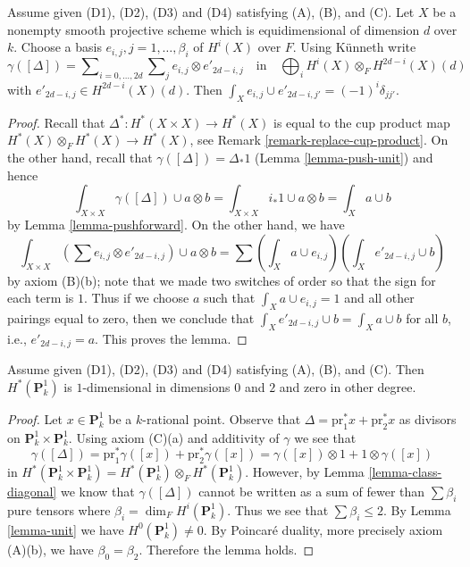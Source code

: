 \begin{lemma}
\label{lemma-class-diagonal}
Assume given (D1), (D2), (D3) and (D4) satisfying (A), (B), and (C).
Let $X$ be a nonempty smooth projective scheme which is equidimensional
of dimension $d$ over $k$. Choose a basis
$e_{i, j}, j = 1, \ldots, \beta_i$ of $H^i(X)$ over $F$.
Using K\"unneth write
$$
\gamma([\Delta]) =
\sum\nolimits_{i = 0, \ldots, 2d}
\sum\nolimits_j e_{i, j} \otimes e'_{2d - i , j}
\quad\text{in}\quad
\bigoplus\nolimits_i H^i(X) \otimes_F H^{2d - i}(X)(d)
$$
with $e'_{2d - i, j} \in H^{2d - i}(X)(d)$.
Then $\int_X e_{i, j} \cup e'_{2d - i, j'} = (-1)^i\delta_{jj'}$.
\end{lemma}

\begin{proof}
Recall that $\Delta^* : H^*(X \times X) \to H^*(X)$ is equal to the
cup product map $H^*(X) \otimes_F H^*(X) \to H^*(X)$, see
Remark \ref{remark-replace-cup-product}. On the other
hand, recall that $\gamma([\Delta]) = \Delta_*1$ (Lemma \ref{lemma-push-unit})
and hence
$$
\int_{X \times X} \gamma([\Delta]) \cup a \otimes b =
\int_{X \times X} i_*1 \cup a \otimes b =
\int_X a \cup b
$$
by Lemma \ref{lemma-pushforward}.
On the other hand, we have
$$
\int_{X \times X} (\sum e_{i, j} \otimes e'_{2d -i , j}) \cup a \otimes b =
\sum (\int_X a \cup e_{i, j})(\int_X e'_{2d - i, j} \cup b)
$$
by axiom (B)(b); note that we made two switches of order so that the sign
for each term is $1$. Thus if we choose $a$ such that
$\int_X a \cup e_{i, j} = 1$ and all other pairings equal to zero, then
we conclude that $\int_X e'_{2d - i, j} \cup b = \int_X a \cup b$
for all $b$, i.e., $e'_{2d - i, j} = a$. This proves the lemma.
\end{proof}

\begin{lemma}
\label{lemma-cohomology-P1}
Assume given (D1), (D2), (D3) and (D4) satisfying (A), (B), and (C).
Then $H^*(\mathbf{P}^1_k)$ is $1$-dimensional in dimensions $0$ and $2$
and zero in other degree.
\end{lemma}

\begin{proof}
Let $x \in \mathbf{P}^1_k$ be a $k$-rational point. Observe that
$\Delta = \text{pr}_1^*x + \text{pr}_2^*x$ as divisors on
$\mathbf{P}^1_k \times \mathbf{P}^1_k$. Using axiom (C)(a)
and additivity of $\gamma$ we see that
$$
\gamma([\Delta]) =
\text{pr}_1^*\gamma([x]) +
\text{pr}_2^*\gamma([x]) =
\gamma([x]) \otimes 1 + 1 \otimes \gamma([x])
$$
in $H^*(\mathbf{P}^1_k \times \mathbf{P}^1_k) =
H^*(\mathbf{P}^1_k) \otimes_F H^*(\mathbf{P}^1_k)$.
However, by Lemma \ref{lemma-class-diagonal}
we know that $\gamma([\Delta])$ cannot be written
as a sum of fewer than $\sum \beta_i$ pure tensors
where $\beta_i = \dim_F H^i(\mathbf{P}^1_k)$.
Thus we see that $\sum \beta_i \leq 2$.
By Lemma \ref{lemma-unit} we have $H^0(\mathbf{P}^1_k) \not = 0$.
By Poincar\'e duality, more precisely axiom (A)(b),
we have $\beta_0 = \beta_2$. Therefore the lemma holds.
\end{proof}

